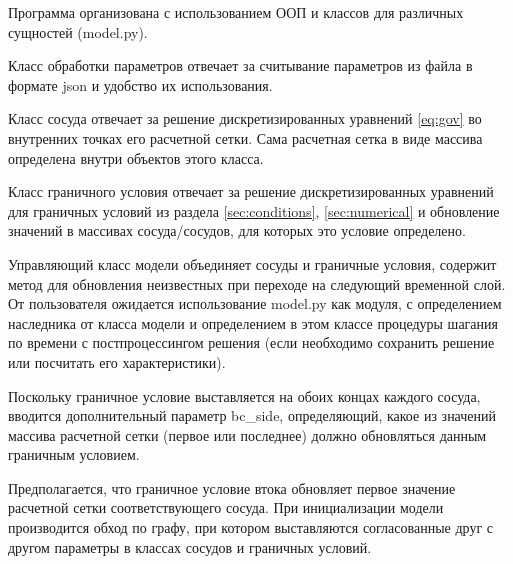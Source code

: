 \documentclass[12pt]{article}
\begin{document}
Программа организована с использованием ООП и классов для различных сущностей (\textrm{model.py}).

Класс обработки параметров отвечает за считывание параметров из файла в формате json и удобство их использования.

Класс сосуда отвечает за решение дискретизированных уравнений \eqref{eq:gov} во внутренних точках его расчетной сетки. Сама расчетная сетка в виде массива определена внутри объектов этого класса.

Класс граничного условия отвечает за решение дискретизированных уравнений для граничных условий из раздела \ref{sec:conditions}, \ref{sec:numerical} и обновление значений в массивах сосуда/сосудов, для которых это условие определено.

Управляющий класс модели объединяет сосуды и граничные условия, содержит метод для обновления неизвестных при переходе на следующий временной слой.
От пользователя ожидается использование model.py как модуля, с определением наследника от класса модели и определением в этом классе процедуры шагания по времени с постпроцессингом решения (если необходимо сохранить решение или посчитать его характеристики).

Поскольку граничное условие выставляется на обоих концах каждого сосуда, вводится дополнительный параметр \textrm{bc\_side}, определяющий, какое из значений массива расчетной сетки (первое или последнее) должно обновляться данным граничным условием.

Предполагается, что граничное условие втока обновляет первое значение расчетной сетки соответствующего сосуда. 
При инициализации модели производится обход по графу, при котором выставляются согласованные друг с другом параметры в классах сосудов и граничных условий.
\end{document}
